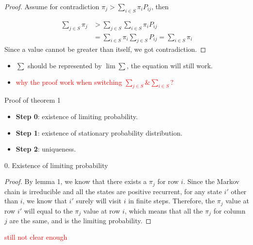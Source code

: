\documentclass[mathserif]{beamer}
\begin{document}
\begin{frame}
	\begin{proof}
		Assume for contradiction $\pi_{j} > \sum_{i \in S} \pi_{i} P_{ij}$, then
		
		\begin{align*}
			\sum_{j \in S} \pi_j &> \sum_{j \in S}\sum_{i \in S} \pi_i P_{ij} \\
			&= \sum_{i \in S} \pi_i \sum_{j \in S} P_{ij} = \sum_{i \in S} \pi_i
		\end{align*}
		Since a value cannot be greater than itself, we got contradiction.
	\end{proof}
	\begin{itemize}
		\item $\sum$ should be represented by $\lim \sum$, the equation will still work.
		\item \textcolor{red}{why the proof work when switching $\sum_{j \in S} \& \sum_{i \in S}$?}
	\end{itemize}
\end{frame}

\begin{frame}{Proof of theorem 1}\label{thm1_proof}
	\begin{itemize}
		\item \textbf{Step 0}: existence of limiting probability.
		\item \textbf{Step 1}: existence of stationary probability distribution.
		\item \textbf{Step 2}: uniqueness.
	\end{itemize}
\end{frame}

\begin{frame}{0. Existence of limiting probability}
	\begin{proof}
		By lemma 1, we know that there exists a $\pi_j$ for row $i$.
		Since the Markov chain is irreducible and all the states are positive recurrent, 
		for any state $i'$ other than $i$, we know that $i'$ surely will visit $i$ in finite steps.
		Therefore, the $\pi_j$ value at row $i'$ will equal to the $\pi_j$ value at row $i$,
		which means that all the $\pi_j$ for column $j$ are the same, and is the limiting probability.
	\end{proof}
	\textcolor{red}{still not clear enough}
\end{frame}
\end{document}
